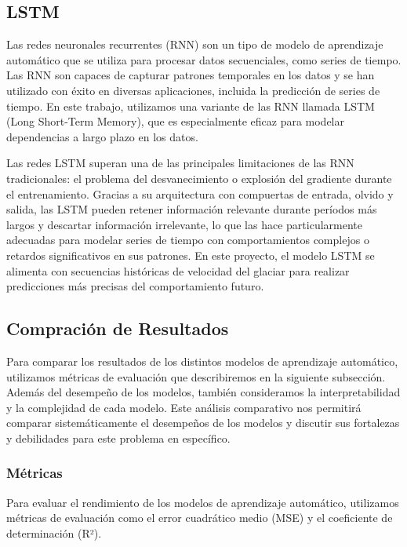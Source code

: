 \documentclass[sigconf,authordraft,language=spanish]{acmart}
\begin{document}
\subsection{LSTM}

Las redes neuronales recurrentes (RNN) son un tipo de modelo de aprendizaje automático que se utiliza para procesar datos secuenciales, como series de tiempo.
Las RNN son capaces de capturar patrones temporales en los datos y se han utilizado con éxito en diversas aplicaciones, incluida la predicción de series de tiempo.
En este trabajo, utilizamos una variante de las RNN llamada LSTM (Long Short-Term Memory), que es especialmente eficaz para modelar dependencias a largo plazo en los datos.

Las redes LSTM superan una de las principales limitaciones de las RNN tradicionales: el problema del desvanecimiento o explosión del gradiente durante el entrenamiento.
 Gracias a su arquitectura con compuertas de entrada, olvido y salida, las LSTM pueden retener información relevante durante períodos más largos y descartar información 
 irrelevante, lo que las hace particularmente adecuadas para modelar series de tiempo con comportamientos complejos o retardos significativos en sus patrones. En este proyecto,
  el modelo LSTM se alimenta con secuencias históricas de velocidad del glaciar para realizar predicciones más precisas del comportamiento futuro.

\subsection{Compración de Resultados}

Para comparar los resultados de los distintos modelos de aprendizaje automático, utilizamos métricas de evaluación que 
describiremos en la siguiente subsección.
Además del desempeño de los modelos, también consideramos la interpretabilidad y la complejidad de cada modelo.
Este análisis comparativo nos permitirá comparar sistemáticamente
el desempeños de los modelos y discutir sus fortalezas y debilidades para este problema en específico.

\subsubsection{Métricas}

Para evaluar el rendimiento de los modelos de aprendizaje automático, utilizamos métricas de evaluación como el error cuadrático medio (MSE) y el coeficiente de determinación (R²).
\end{document}
